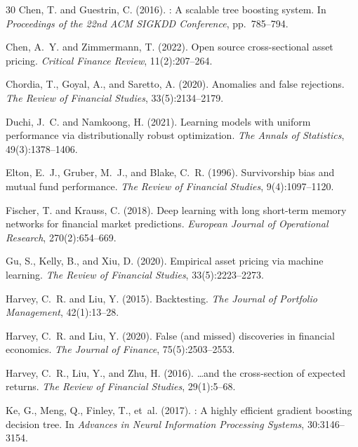 \documentclass[12pt,a4paper]{article}
\begin{document}
\begin{thebibliography}{30}
Chen, T. and Guestrin, C. (2016).
: A scalable tree boosting system.
\newblock In \emph{Proceedings of the 22nd ACM SIGKDD Conference}, pp.~785--794.

Chen, A.~Y. and Zimmermann, T. (2022).
\newblock Open source cross-sectional asset pricing.
\newblock \emph{Critical Finance Review}, 11(2):207--264.

Chordia, T., Goyal, A., and Saretto, A. (2020).
\newblock Anomalies and false rejections.
\newblock \emph{The Review of Financial Studies}, 33(5):2134--2179.

Duchi, J.~C. and Namkoong, H. (2021).
\newblock Learning models with uniform performance via distributionally robust optimization.
\newblock \emph{The Annals of Statistics}, 49(3):1378--1406.

Elton, E.~J., Gruber, M.~J., and Blake, C.~R. (1996).
\newblock Survivorship bias and mutual fund performance.
\newblock \emph{The Review of Financial Studies}, 9(4):1097--1120.

Fischer, T. and Krauss, C. (2018).
\newblock Deep learning with long short-term memory networks for financial
  market predictions.
\newblock \emph{European Journal of Operational Research}, 270(2):654--669.

Gu, S., Kelly, B., and Xiu, D. (2020).
\newblock Empirical asset pricing via machine learning.
\newblock \emph{The Review of Financial Studies}, 33(5):2223--2273.

Harvey, C.~R. and Liu, Y. (2015).
\newblock Backtesting.
\newblock \emph{The Journal of Portfolio Management}, 42(1):13--28.

Harvey, C.~R. and Liu, Y. (2020).
\newblock False (and missed) discoveries in financial economics.
\newblock \emph{The Journal of Finance}, 75(5):2503--2553.

Harvey, C.~R., Liu, Y., and Zhu, H. (2016).
\newblock \ldots and the cross-section of expected returns.
\newblock \emph{The Review of Financial Studies}, 29(1):5--68.

Ke, G., Meng, Q., Finley, T., et~al. (2017).
: A highly efficient gradient boosting decision tree.
\newblock In \emph{Advances in Neural Information Processing Systems}, 30:3146--3154.



\end{thebibliography}
\end{document}
